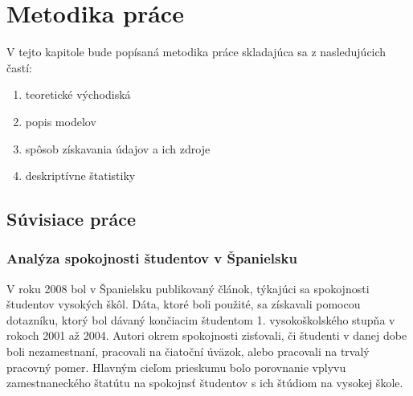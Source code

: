 \chapter{Metodika práce}
V tejto kapitole bude popísaná metodika práce skladajúca sa z nasledujúcich častí:
\label{kap:metodika}

\begin{enumerate}
	\item  teoretické východiská
	\item  popis modelov
	\item  spôsob získavania údajov a ich zdroje
	\item  deskriptívne štatistiky
\end{enumerate}

\newpage

\section{Súvisiace práce}

\subsection{Analýza spokojnosti študentov v Španielsku}
\qquad V roku 2008 bol v Španielsku publikovaný článok, týkajúci sa spokojnosti študentov vysokých škôl.\cite{spain} Dáta, ktoré boli použité, sa získavali pomocou dotazníku, ktorý bol dávaný končiacim študentom 1. vysokoškolského stupňa v rokoch 2001 až 2004. Autori okrem spokojnosti zisťovali, či študenti v danej dobe boli nezamestnaní, pracovali na čiatoční úväzok, alebo pracovali na trvalý pracovný pomer. Hlavným cieľom prieskumu bolo porovnanie vplyvu zamestnaneckého štatútu na spokojnsť študentov s ich štúdiom na vysokej škole. 

